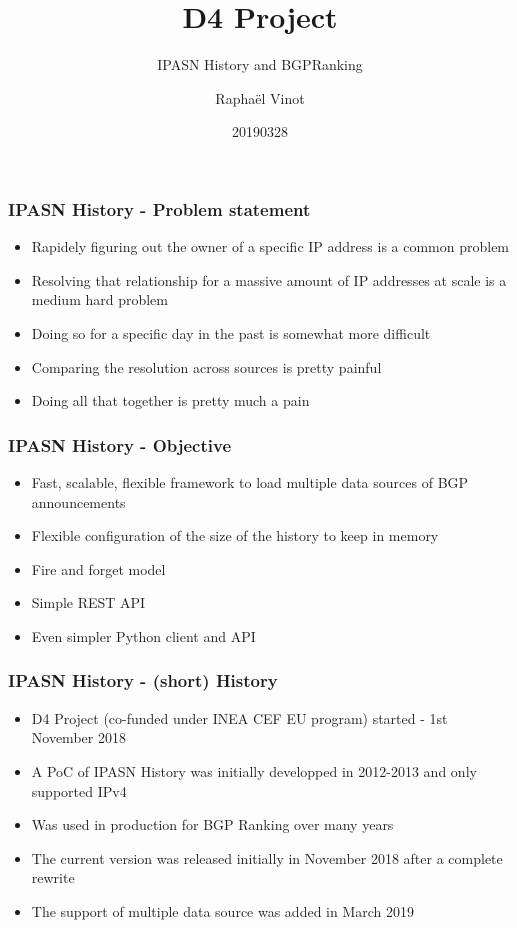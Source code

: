 \documentclass{beamer}
\title{D4 Project}
\subtitle{IPASN History and BGPRanking}
\author{Raphaël Vinot}
\institute{Team CIRCL \\ \url{https://www.d4-project.org/}}
\date{20190328}
\begin{document}
    \begin{frame}
        \maketitle
    \end{frame}

\begin{frame}
    \frametitle{IPASN History - Problem statement}
    \begin{itemize}
        \item Rapidely figuring out the owner of a specific IP address is a common problem
        \item Resolving that relationship for a massive amount of IP addresses at scale is a medium hard problem
        \item Doing so for a specific day in the past is somewhat more difficult
        \item Comparing the resolution across sources is pretty painful
        \item Doing all that together is pretty much a pain
    \end{itemize}
\end{frame}


\begin{frame}
 \frametitle{IPASN History - Objective}
 \begin{itemize}
         \item Fast, scalable, flexible framework to load multiple data sources of BGP announcements
         \item Flexible configuration of the size of the history to keep in memory
         \item Fire and forget model
         \item Simple REST API
         \item Even simpler Python client and API
 \end{itemize}
\end{frame}

\begin{frame}
        \frametitle{IPASN History - (short) History}
 \begin{itemize}
        \item D4 Project (co-funded under INEA CEF EU program) started - 1st November 2018
        \item A PoC of IPASN History was initially developped in 2012-2013 and only supported IPv4
        \item Was used in production for BGP Ranking over many years
        \item The current version was released initially in November 2018 after a complete rewrite
        \item The support of multiple data source was added in March 2019
 \end{itemize}
\end{frame}
\end{document}
